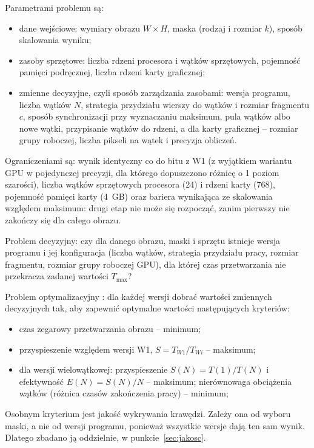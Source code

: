 \documentclass[12pt,a4paper]{article}
\begin{document}
Parametrami problemu są:
\begin{itemize}
	\item dane wejściowe: wymiary obrazu $W \times H$, maska (rodzaj i rozmiar $k$), sposób skalowania wyniku;
	\item zasoby sprzętowe: liczba rdzeni procesora i wątków sprzętowych, pojemność pamięci podręcznej, liczba rdzeni karty graficznej;
	\item zmienne decyzyjne, czyli sposób zarządzania zasobami: wersja programu, liczba wątków $N$, strategia przydziału wierszy do wątków i rozmiar fragmentu $c$, sposób synchronizacji przy wyznaczaniu maksimum, pula wątków albo nowe wątki, przypisanie wątków do rdzeni, a dla karty graficznej -- rozmiar grupy roboczej, liczba pikseli na wątek i precyzja obliczeń.
\end{itemize}
Ograniczeniami są: wynik identyczny co do bitu z W1 (z wyjątkiem wariantu GPU w pojedynczej precyzji, dla którego dopuszczono różnicę o 1 poziom szarości), liczba wątków sprzętowych procesora (24) i rdzeni karty (768), pojemność pamięci karty (4~GB) oraz bariera wynikająca ze skalowania względem maksimum: drugi etap nie może się rozpocząć, zanim pierwszy nie zakończy się dla całego obrazu.

Problem decyzyjny: czy dla danego obrazu, maski i sprzętu istnieje wersja programu i jej konfiguracja (liczba wątków, strategia przydziału pracy, rozmiar fragmentu, rozmiar grupy roboczej GPU), dla której czas przetwarzania nie przekracza zadanej wartości $T_{\max}$?

Problem optymalizacyjny \cite{czech}: dla każdej wersji dobrać wartości zmiennych decyzyjnych tak, aby zapewnić optymalne wartości następujących kryteriów:
\begin{itemize}
	\item czas zegarowy przetwarzania obrazu -- minimum;
	\item przyspieszenie względem wersji W1, $S = T_{W1} / T_{Wi}$ -- maksimum;
	\item dla wersji wielowątkowej: przyspieszenie $S(N) = T(1)/T(N)$ i efektywność $E(N) = S(N)/N$ -- maksimum; nierównowaga obciążenia wątków (różnica czasów zakończenia pracy) -- minimum;
\end{itemize}
Osobnym kryterium jest jakość wykrywania krawędzi. Zależy ona od wyboru maski, a nie od wersji programu, ponieważ wszystkie wersje dają ten sam wynik. Dlatego zbadano ją oddzielnie, w punkcie~\ref{sec:jakosc}.

\end{document}
